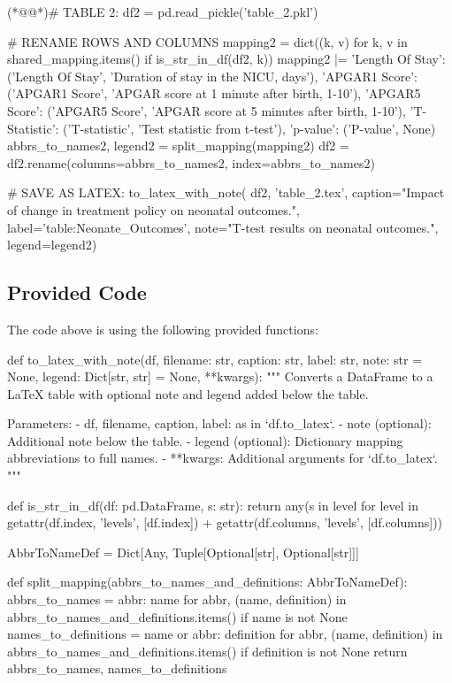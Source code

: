 \documentclass[11pt]{article}
\begin{document}
\begin{python}
(*@@*)# TABLE 2:
df2 = pd.read_pickle('table_2.pkl')

# RENAME ROWS AND COLUMNS
mapping2 = dict((k, v) for k, v in shared_mapping.items() if is_str_in_df(df2, k)) 
mapping2 |= {
    'Length Of Stay': ('Length Of Stay', 'Duration of stay in the NICU, days'),
    'APGAR1 Score': ('APGAR1 Score', 'APGAR score at 1 minute after birth, 1-10'),
    'APGAR5 Score': ('APGAR5 Score', 'APGAR score at 5 minutes after birth, 1-10'),
    'T-Statistic': ('T-statistic', 'Test statistic from t-test'), 
    'p-value': ('P-value', None)
}
abbrs_to_names2, legend2 = split_mapping(mapping2)
df2 = df2.rename(columns=abbrs_to_names2, index=abbrs_to_names2)

# SAVE AS LATEX:
to_latex_with_note(
    df2, 'table_2.tex',
    caption="Impact of change in treatment policy on neonatal outcomes.",
    label='table:Neonate_Outcomes',
    note="T-test results on neonatal outcomes.",
    legend=legend2)


\end{python}

\subsection{Provided Code}
The code above is using the following provided functions:

\begin{python}
def to_latex_with_note(df, filename: str, caption: str, label: str, note: str = None, legend: Dict[str, str] = None, **kwargs):
    """
    Converts a DataFrame to a LaTeX table with optional note and legend added below the table.

    Parameters:
    - df, filename, caption, label: as in `df.to_latex`.
    - note (optional): Additional note below the table.
    - legend (optional): Dictionary mapping abbreviations to full names.
    - **kwargs: Additional arguments for `df.to_latex`.
    """

def is_str_in_df(df: pd.DataFrame, s: str):
    return any(s in level for level in getattr(df.index, 'levels', [df.index]) + getattr(df.columns, 'levels', [df.columns]))

AbbrToNameDef = Dict[Any, Tuple[Optional[str], Optional[str]]]

def split_mapping(abbrs_to_names_and_definitions: AbbrToNameDef):
    abbrs_to_names = {abbr: name for abbr, (name, definition) in abbrs_to_names_and_definitions.items() if name is not None}
    names_to_definitions = {name or abbr: definition for abbr, (name, definition) in abbrs_to_names_and_definitions.items() if definition is not None}
    return abbrs_to_names, names_to_definitions

\end{python}
\end{document}
